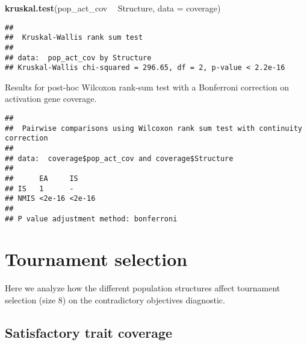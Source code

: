 \documentclass[]{book}
\newenvironment{Shaded}{\begin{snugshade}}{\end{snugshade}}
\newcommand{\DataTypeTok}[1]{\textcolor[rgb]{0.13,0.29,0.53}{#1}}
\newcommand{\KeywordTok}[1]{\textcolor[rgb]{0.13,0.29,0.53}{\textbf{#1}}}
\newcommand{\NormalTok}[1]{#1}
\newcommand{\OperatorTok}[1]{\textcolor[rgb]{0.81,0.36,0.00}{\textbf{#1}}}
\newcommand{\OtherTok}[1]{\textcolor[rgb]{0.56,0.35,0.01}{#1}}
\newcommand{\StringTok}[1]{\textcolor[rgb]{0.31,0.60,0.02}{#1}}
\begin{document}
\begin{Shaded}
\begin{Highlighting}[]
\KeywordTok{kruskal.test}\NormalTok{(pop_act_cov }\OperatorTok{~}\StringTok{ }\NormalTok{Structure, }\DataTypeTok{data =}\NormalTok{ coverage)}
\end{Highlighting}
\end{Shaded}

\begin{verbatim}
## 
##  Kruskal-Wallis rank sum test
## 
## data:  pop_act_cov by Structure
## Kruskal-Wallis chi-squared = 296.65, df = 2, p-value < 2.2e-16
\end{verbatim}

Results for post-hoc Wilcoxon rank-sum test with a Bonferroni correction on activation gene coverage.

\begin{Shaded}
\end{Shaded}

\begin{verbatim}
## 
##  Pairwise comparisons using Wilcoxon rank sum test with continuity correction 
## 
## data:  coverage$pop_act_cov and coverage$Structure 
## 
##      EA     IS    
## IS   1      -     
## NMIS <2e-16 <2e-16
## 
## P value adjustment method: bonferroni
\end{verbatim}

\hypertarget{tournament-selection-10}{%
\section{Tournament selection}\label{tournament-selection-10}}

Here we analyze how the different population structures affect tournament selection (size 8) on the contradictory objectives diagnostic.

\hypertarget{satisfactory-trait-coverage-7}{%
\subsection{Satisfactory trait coverage}\label{satisfactory-trait-coverage-7}}
\end{document}

